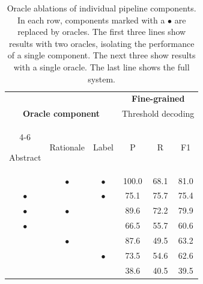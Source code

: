 \begin{table}[t]
  \footnotesize
  \setlength{\tabcolsep}{0.6em}
  \centering

  \begin{tabularx}{\linewidth}{*{3}{c} *{3}{c}}
    \toprule
    & & & \multicolumn{3}{c}{\textbf{Fine-grained}} \\
    \multicolumn{3}{c}{\textbf{Oracle component}} & \multicolumn{3}{c}{Threshold decoding} \\

    \cmidrule(lr){4-6}

    Abstract & Rationale & Label & P & R & F1 \\

    \midrule

           &  $\bullet$ &  $\bullet$ &          100.0 &        68.1 &    81.0 \\
 $\bullet$ &            &  $\bullet$ &           75.1 &        75.7 &    75.4 \\
 $\bullet$ &  $\bullet$ &            &           89.6 &        72.2 &    79.9 \\
 
 \midrule
 
 $\bullet$ &            &            &           66.5 &        55.7 &    60.6 \\
           &  $\bullet$ &            &           87.6 &        49.5 &    63.2 \\
           &            &  $\bullet$ &           73.5 &        54.6 &    62.6 \\
           
          \midrule 
           
           &            &            &           38.6 &        40.5 &    39.5 \\



    \bottomrule

  \end{tabularx}
  \caption{Oracle ablations of individual pipeline components. In each row, components marked with a $\bullet$ are replaced by oracles. The first three lines show results with two oracles, isolating the performance of a single \sysname component. The next three show results with a single oracle. The last line shows the full \sysname system. }
  \label{tbl:pipeline_components}



\end{table}



